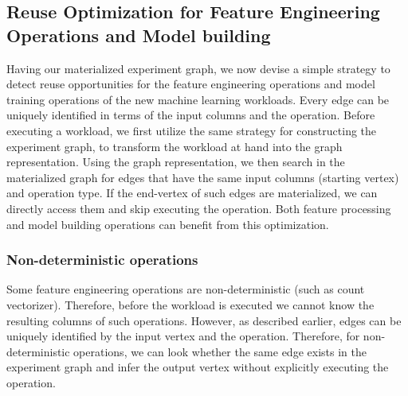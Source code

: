 \subsection{Reuse Optimization for Feature Engineering Operations and Model building}
Having our materialized experiment graph, we now devise a simple strategy to detect reuse opportunities for the feature engineering operations and model training operations of the new machine learning workloads.
Every edge can be uniquely identified in terms of the input columns and the operation.
Before executing a workload, we first utilize the same strategy for constructing the experiment graph, to transform the workload at hand into the graph representation.
Using the graph representation, we then search in the materialized graph for edges that have the same input columns (starting vertex) and operation type.
If the end-vertex of such edges are materialized, we can directly access them and skip executing the operation.
Both feature processing and model building operations can benefit from this optimization.

\subsubsection{Non-deterministic operations}
Some feature engineering operations are non-deterministic (such as count vectorizer).
Therefore, before the workload is executed we cannot know the resulting columns of such operations.
However, as described earlier, edges can be uniquely identified by the input vertex and the operation.
Therefore, for non-deterministic operations, we can look whether the same edge exists in the experiment graph and infer the output vertex without explicitly executing the operation.



